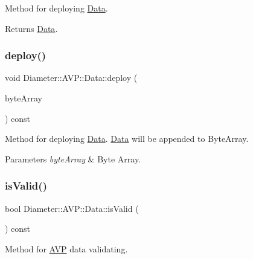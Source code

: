Method for deploying \hyperlink{classDiameter_1_1AVP_1_1Data}{Data}. 

\begin{DoxyReturn}{Returns}
\hyperlink{classDiameter_1_1AVP_1_1Data}{Data}. 
\end{DoxyReturn}
\mbox{\label{classDiameter_1_1AVP_1_1Data_a3c6e4d52e46b76b84fd8b9041638cc7f}} 
\subsubsection{\texorpdfstring{deploy()}{deploy()}\hspace{0.1cm}{\footnotesize\ttfamily [2/2]}}
{\footnotesize\ttfamily void Diameter\+::\+A\+V\+P\+::\+Data\+::deploy (\begin{DoxyParamCaption}\item[{Byte\+Array \&}]{byte\+Array }\end{DoxyParamCaption}) const}



Method for deploying \hyperlink{classDiameter_1_1AVP_1_1Data}{Data}. \hyperlink{classDiameter_1_1AVP_1_1Data}{Data} will be appended to Byte\+Array. 


\begin{DoxyParams}{Parameters}
{\em byte\+Array} & Byte Array. \\
\hline
\end{DoxyParams}
\mbox{\label{classDiameter_1_1AVP_1_1Data_adf7dd6eb3736b2d0269f57774758480e}} 
\subsubsection{\texorpdfstring{is\+Valid()}{isValid()}}
{\footnotesize\ttfamily bool Diameter\+::\+A\+V\+P\+::\+Data\+::is\+Valid (\begin{DoxyParamCaption}{ }\end{DoxyParamCaption}) const}



Method for \hyperlink{classDiameter_1_1AVP}{A\+VP} data validating. 


